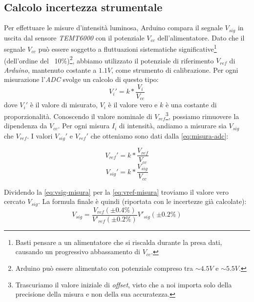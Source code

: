 \subsection{Calcolo incertezza strumentale}\label{subsec:calcolo-incertezza-strumentale}
  Per effettuare le misure d'intensità luminosa, Arduino compara
  il segnale $V_{sig}$ in uscita dal sensore \emph{TEMT6000} con il potenziale
  $V_{cc}$ dell'alimentatore.
  Dato che il segnale $V_{cc}$ può essere soggetto a fluttuazioni sistematiche significative\footnote{Basti pensare a un alimentatore che si riscalda durante la presa dati,
  causando un progressivo abbassamento di $V_{cc}$.}
  (dell'ordine del ~10\%)\footnote{Arduino può essere alimentato con potenziale compreso tra $\sim 4.5V$ e $\sim 5.5V$.}, abbiamo utilizzato il potenziale di riferimento
  $V_{ref}$ di \emph{Arduino}, mantenuto costante a $1.1V$, come strumento di
  calibrazione.
  Per ogni misurazione l'\emph{ADC} svolge un calcolo di questo tipo:
  \begin{equation}
    V_i' = k * \frac {V_i} {V_{cc}}
    \label{eq:misura-adc}
  \end{equation}
  \noindent dove $V_i'$ è il valore di misurato, $V_i$ è il valore vero e $k$
  è una costante di proporzionalità. Conoscendo il valore nominale
  di $V_{ref}$\footnote{Trascuriamo il valore iniziale di \emph{offset}, visto che
  a noi importa solo della precisione della misura e non della sua accuratezza.}, possiamo rimuovere la
  dipendenza da $V_{cc}$. Per ogni misura $I_i$ di intensità, andiamo a misurare sia $V_{sig}$ che $V_{ref}$.
  I valori $V_{sig}'$ e $V_{ref}'$ che otteniamo sono dati dalla \eqref{eq:misura-adc}:
  \vspace{-10mm}
  \begin{multicols}{2}
    \begin{equation}
      V_{ref}' = k * \frac {V_{ref}} {V_{cc}}
      \label{eq:vref-misura}
    \end{equation}
  \break
    \begin{equation}
      V_{sig}' = k * \frac {V_{sig}} {V_{cc}}
      \label{eq:vsig-misura}
    \end{equation}
  \end{multicols}
  \noindent Dividendo la \eqref{eq:vsig-misura} per la \eqref{eq:vref-misura} troviamo il valore vero cercato $V_{sig}$.
  La formula finale è quindi (riportata con le incertezze già calcolate):
  \begin{equation}
    V_{sig} = \frac {
      V_{ref} (\pm 0.4\%)
    } {
      V'_{ref} (\pm 0.2\%)
    } V'_{sig} (\pm 0.2\%)
    \label{eq:misura-intensità}
  \end{equation}
